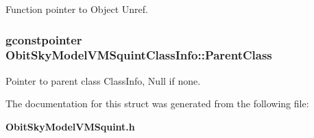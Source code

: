Function pointer to Object Unref. 

\subsubsection{\setlength{\rightskip}{0pt plus 5cm}gconstpointer {\bf Obit\-Sky\-Model\-VMSquint\-Class\-Info::Parent\-Class}}\label{structObitSkyModelVMSquintClassInfo_o3}


Pointer to parent class Class\-Info, Null if none. 



The documentation for this struct was generated from the following file:\begin{CompactItemize}
\item 
{\bf Obit\-Sky\-Model\-VMSquint.h}\end{CompactItemize}
